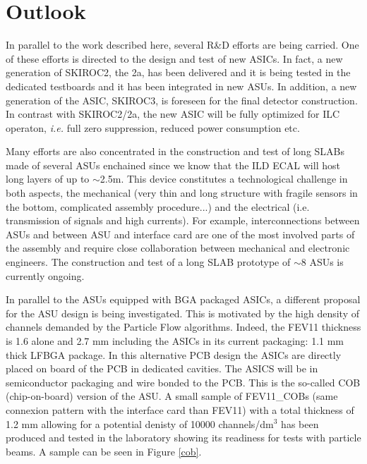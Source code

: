 \documentclass[final,3p,times,twocolumn]{elsarticle}
\begin{document}
\section{Outlook}
\label{sec:outlook}

In parallel to the work described here, several R\&D efforts are being carried.
One of these efforts is directed to the design and test of new ASICs.
In fact, a new generation of SKIROC2, the 2a, has been delivered
and it is being tested in the dedicated testboards and it has been integrated in new ASUs.
In addition, a new generation of the ASIC, SKIROC3, is foreseen for the final detector construction.
In contrast with SKIROC2/2a, the new ASIC will be fully optimized for ILC operaton, {\it i.e.} full zero suppression, reduced power consumption etc.

Many efforts are also concentrated in the construction and test of long SLABs
made of several ASUs enchained since we know that the ILD ECAL will host long layers of up to $\sim$2.5m.
This device constitutes a technological challenge in both aspects, the mechanical
(very thin and long structure with fragile sensors in the bottom, complicated assembly procedure...)
and the electrical (i.e. transmission of signals and high currents).
For example, interconnections between ASUs and between ASU and interface card are one of
the most involved parts of the assembly
and require close collaboration between mechanical and electronic engineers.
The construction and test of a long SLAB prototype
of $\sim8$ ASUs is currently ongoing.

In parallel to the ASUs equipped with BGA packaged ASICs, a different proposal for the ASU
design is being investigated. This is motivated by the high density of channels
demanded by the Particle Flow algorithms. Indeed, the FEV11 thickness is 1.6 alone and 2.7 mm
including the ASICs in its current packaging: 1.1 mm thick LFBGA package.
In this alternative PCB design the ASICs
are directly placed on board of the PCB in dedicated cavities.
The ASICS will be in semiconductor packaging and wire bonded to the PCB. This is the so-called COB (chip-on-board) version of the ASU.
A small sample of FEV11\_COBs (same connexion pattern with the interface card than FEV11)
with a total thickness of 1.2 mm allowing for a potential denisty of 10000 channels/dm$^{3}$ has been produced and tested in the laboratory
showing its readiness for tests with particle beams. A sample can be seen in Figure \ref{cob}.
\end{document}
